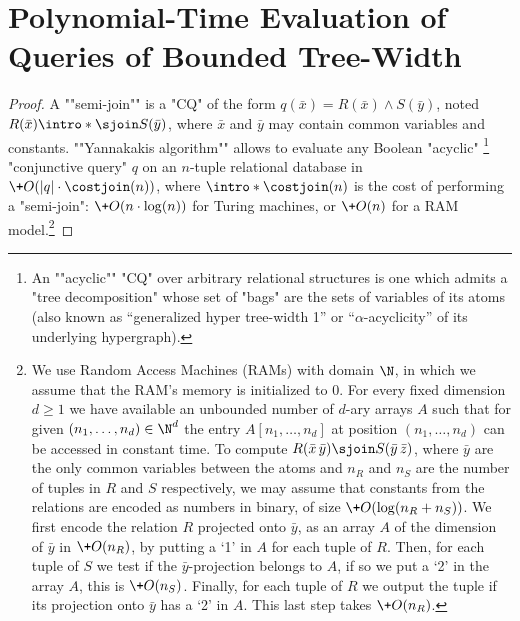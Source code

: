\section{\AP{}Polynomial-Time Evaluation of Queries of Bounded Tree-Width}
\label{apdx-sec:prop:crpq-bound-tree-width-upper-bound}

\crpqboundtwupperbound*
\begin{proof}
    \AP
    \knowledgenewrobustcmd{\sjoin}{\cmdkl{\ltimes}}
    A ""semi-join"" is a "CQ" of the form $q(\bar x) = R(\bar x) \land S(\bar y)$, noted $R(\bar x) \intro*\sjoin S(\bar y)$, where $\bar x$ and $\bar y$ may contain common variables and constants. \AP ""Yannakakis algorithm"" \cite{Yannakakis81Algorithms} allows to evaluate any Boolean "acyclic"%
	\footnote{%
	An \AP""acyclic"" "CQ" over arbitrary relational structures is one which admits a "tree decomposition" whose set of "bags" are the sets of variables of its atoms (also known as ``generalized hyper tree-width 1'' or ``$\alpha$-acyclicity'' of its underlying hypergraph).
	} 
	"conjunctive query" $q$ on an $n$-tuple relational database in $\+O(|q| \cdot \costjoin(n))$, where $\intro*\costjoin(n)$ is the cost of performing a "semi-join": $\+O(n \cdot \log(n))$ for Turing machines, or $\+O(n)$ for a RAM model.\footnote{
		We use Random Access Machines (RAMs) with domain $\N$, in which we assume that the RAM's memory is initialized to 0. 
		For every fixed dimension $d \geq 1$  we have available an unbounded number of $d$-ary arrays $A$ such that for given $(n_1, \dotsc, n_d) \in \N^d$ the entry $A[n_1, \dotsc, n_d]$ at position $(n_1, \dotsc, n_d)$ can be accessed in constant time.
		To compute $R(\bar x \, \bar y) \sjoin S(\bar y \, \bar z)$, where $\bar y$ are the only common variables between the atoms and $n_R$ and $n_S$ are the number of tuples in $R$ and $S$ respectively, we may assume that constants from the relations are encoded as numbers in binary, of size $\+O(\log(n_R + n_S))$. 
		We first encode the relation $R$ projected onto $\bar y$, as an array $A$ of the dimension of $\bar y$ in $\+O(n_R)$, by putting a `1' in $A$ for each tuple of $R$. 
		Then, for each tuple of $S$ we test if the $\bar y$-projection belongs to $A$, if so we put a `2' in the array $A$, this is $\+O(n_S)$. 
		Finally, for each tuple of $R$ we output the tuple if its projection onto $\bar y$ has a `2' in $A$. This last step takes $\+O(n_R)$.
	}


\end{proof}
